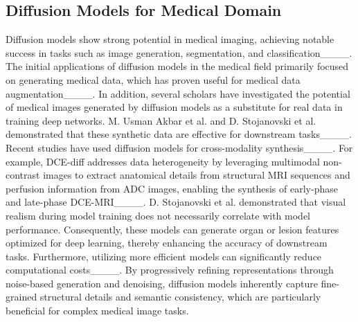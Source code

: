 \subsection{Diffusion Models for Medical Domain}
Diffusion models show strong potential in medical imaging, achieving notable success in tasks such as image generation, segmentation, and classification____. The initial applications of diffusion models in the medical field primarily focused on generating medical data, which has proven useful for medical data augmentation____. In addition, several scholars have investigated the potential of medical images generated by diffusion models as a substitute for real data in training deep networks. M. Usman Akbar et al. and D. Stojanovski et al. demonstrated that these synthetic data are effective for downstream tasks____. Recent studies have used diffusion models for cross-modality synthesis____. For example, DCE-diff addresses data heterogeneity by leveraging multimodal non-contrast images to extract anatomical details from structural MRI sequences and perfusion information from ADC images, enabling the synthesis of early-phase and late-phase DCE-MRI____. D. Stojanovski et al. demonstrated that visual realism during model training does not necessarily correlate with model performance. Consequently, these models can generate organ or lesion features optimized for deep learning, thereby enhancing the accuracy of downstream tasks. Furthermore, utilizing more efficient models can significantly reduce computational costs____. By progressively refining representations through noise-based generation and denoising, diffusion models inherently capture fine-grained structural details and semantic consistency, which are particularly beneficial for complex medical image tasks.

